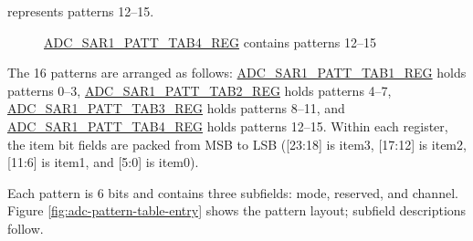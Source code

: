 \documentclass[main\_\_EN.tex]{subfiles}
\begin{document}
%
%
%
%
\begin{regdesc}\begin{reglist}
\item [item \regindex{x}] represents patterns 12--15.
\end{reglist}\end{regdesc}
\vspace{-2em}
\begin{figure}[H]
    \centering
    \caption{\hyperref[regdesc:ADCSAR1PATTTAB4REG]{ADC\_SAR1\_PATT\_TAB4\_REG} contains patterns 12--15}
    \label{fig:adc-sar1-patt-tab4-reg-entry12-entry15}
\end{figure}

The 16 patterns are arranged as follows: \hyperref[regdesc:ADCSAR1PATTTAB1REG]{ADC\_SAR1\_PATT\_TAB1\_REG} holds patterns 0--3, \hyperref[regdesc:ADCSAR1PATTTAB2REG]{ADC\_SAR1\_PATT\_TAB2\_REG} holds patterns 4--7, \hyperref[regdesc:ADCSAR1PATTTAB3REG]{ADC\_SAR1\_PATT\_TAB3\_REG} holds patterns 8--11, and \hyperref[regdesc:ADCSAR1PATTTAB4REG]{ADC\_SAR1\_PATT\_TAB4\_REG} holds patterns 12--15. Within each register, the item bit fields are packed from MSB to LSB ([23:18] is item3, [17:12] is item2, [11:6] is item1, and [5:0] is item0).

Each pattern is 6 bits and contains three subfields: mode, reserved, and channel. Figure \ref{fig:adc-pattern-table-entry} shows the pattern layout; subfield descriptions follow. 
\end{document}
